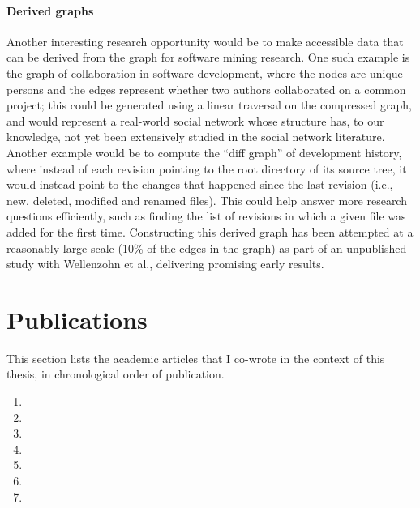 \paragraph*{Derived graphs}

Another interesting research opportunity would be to make accessible data
that can be derived from the graph for software mining research. One such
example is the graph of collaboration in software development, where the nodes
are unique persons and the edges represent whether two authors collaborated on
a common project; this could be generated using a linear traversal on the
compressed graph, and would represent a real-world social network whose
structure has, to our knowledge, not yet been extensively studied in the
social network literature. Another example would be to compute the ``diff
graph'' of development history, where instead of each revision pointing to the
root directory of its source tree, it would instead point to the changes that
happened since the last revision (i.e., new, deleted, modified and renamed
files). This could help answer more research questions efficiently, such as
finding the list of revisions in which a given file was added for the first
time. Constructing this derived graph has been attempted at a reasonably
large scale (10\% of the edges in the graph) as part of an unpublished study
with Wellenzohn et al., delivering promising early results.

\section{Publications}

This section lists the academic articles that I co-wrote in the context of this
thesis, in chronological order of publication.

\begin{enumerate}
    \item {}
    \item {}
    \item {}
    \item {}
    \item {}
    \item {}
    \item {}
\end{enumerate}
